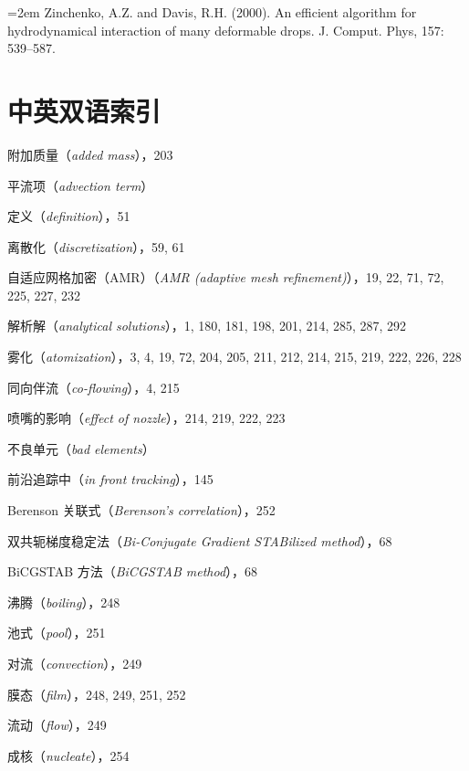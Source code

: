 \documentclass[11pt,a4paper,openany,fontset=none]{ctexbook}
\begin{document}
\par\hangindent=2em Zinchenko, A.Z. and Davis, R.H. (2000). An efficient algorithm for hydrodynamical interaction of many deformable drops. J. Comput. Phys, 157: 539--587.

\endgroup


\chapter*{中英双语索引}
\begingroup\small
\setlength{\parindent}{0pt}
\setlength{\parskip}{0.25em}
附加质量（\textit{added mass}），203\par
平流项（\textit{advection term}）\par
\quad 定义（\textit{definition}），51\par
\quad 离散化（\textit{discretization}），59, 61\par
自适应网格加密（AMR）（\textit{AMR (adaptive mesh refinement)}），19, 22, 71, 72, 225, 227, 232\par
解析解（\textit{analytical solutions}），1, 180, 181, 198, 201, 214, 285, 287, 292\par
雾化（\textit{atomization}），3, 4, 19, 72, 204, 205, 211, 212, 214, 215, 219, 222, 226, 228\par
\quad 同向伴流（\textit{co-flowing}），4, 215\par
\quad 喷嘴的影响（\textit{effect of nozzle}），214, 219, 222, 223\par
不良单元（\textit{bad elements}）\par
\quad 前沿追踪中（\textit{in front tracking}），145\par
Berenson 关联式（\textit{Berenson’s correlation}），252\par
双共轭梯度稳定法（\textit{Bi-Conjugate Gradient STABilized method}），68\par
BiCGSTAB 方法（\textit{BiCGSTAB method}），68\par
沸腾（\textit{boiling}），248\par
\quad 池式（\textit{pool}），251\par
\quad 对流（\textit{convection}），249\par
\quad 膜态（\textit{film}），248, 249, 251, 252\par
\quad 流动（\textit{flow}），249\par
\quad 成核（\textit{nucleate}），254\par
\end{document}
